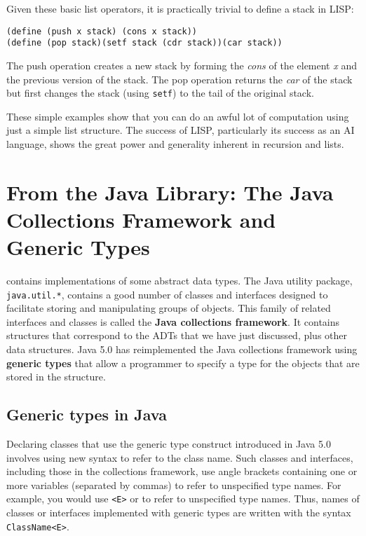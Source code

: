 Given these basic list operators, it is practically trivial to define
a stack in LISP:

\begin{jjjlisting}
\begin{lstlisting}
(define (push x stack) (cons x stack))        
(define (pop stack)(setf stack (cdr stack))(car stack))
\end{lstlisting}
\end{jjjlisting}

\noindent The push operation creates a new stack by forming the {\it cons}
of the element {\it x} and the previous version of the
stack.  The pop operation returns the {\it car} of the stack but
first changes the stack (using {\tt setf}) to the tail of the original
stack.

These simple examples show that you can do an awful lot of computation
using just a simple list structure.  The success of LISP, particularly
its success as an AI language, shows the great power and generality
inherent in recursion and lists.

\section{From the Java Library: The Java Collections Framework and Generic Types}

\WWWjava

 contains implementations of some
abstract data types.  The Java utility package, {\tt java.util.*},
contains a good number of classes and interfaces designed to
facilitate storing and manipulating groups of objects.  This family of
related interfaces and classes is called the {\bf Java collections
framework}.  It contains structures that correspond to the ADTs that
we have just discussed, plus other data structures.  Java 5.0 has
reimplemented the Java collections framework using {\bf generic types}
that allow a programmer to specify a type for the objects that are
stored in the structure.

\subsection{Generic types in Java}

Declaring classes that use the generic type construct introduced in Java 5.0
involves using new syntax to refer to the class name. Such classes and
interfaces, including those in the collections framework, use angle
brackets containing one or more variables (separated by commas) to
refer to unspecified type names.  For example, you would use {\tt <E>}
or {\tt <K,V>} to refer to unspecified type names. Thus, names of
classes or interfaces implemented with generic types are written with
the syntax {\tt ClassName<E>}.

